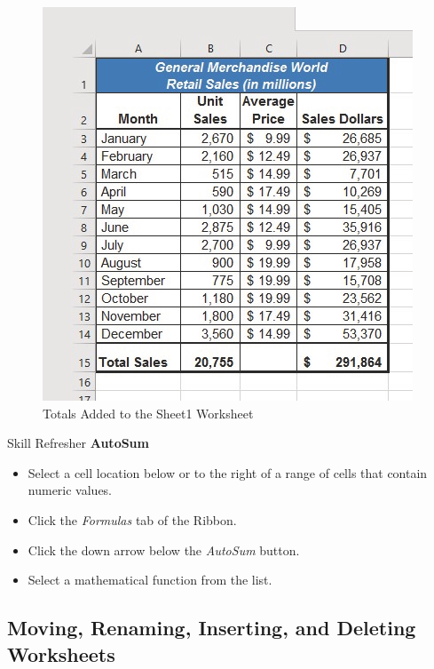 \begin{figure}[H]
	\centering
	\includegraphics[width=\maxwidth{.95\linewidth}]{gfx/ch01_fig46}
	\caption{Totals Added to the Sheet1 Worksheet}
	\label{01:fig46}
\end{figure}

\begin{center}
	\begin{sklbox}{Skill Refresher}
		\textbf{AutoSum}
		\\
		\begin{itemize}
			\setlength{\itemsep}{0pt}
			\setlength{\parskip}{0pt}
			\setlength{\parsep}{0pt}
			
			\item Select a cell location below or to the right of a range of cells that contain numeric values.
			\item Click the \textit{Formulas} tab of the Ribbon.
			\item Click the down arrow below the \textit{AutoSum} button.
			\item Select a mathematical function from the list.
			
		\end{itemize}
	\end{sklbox}
\end{center}

\subsection{Moving, Renaming, Inserting, and Deleting Worksheets}

